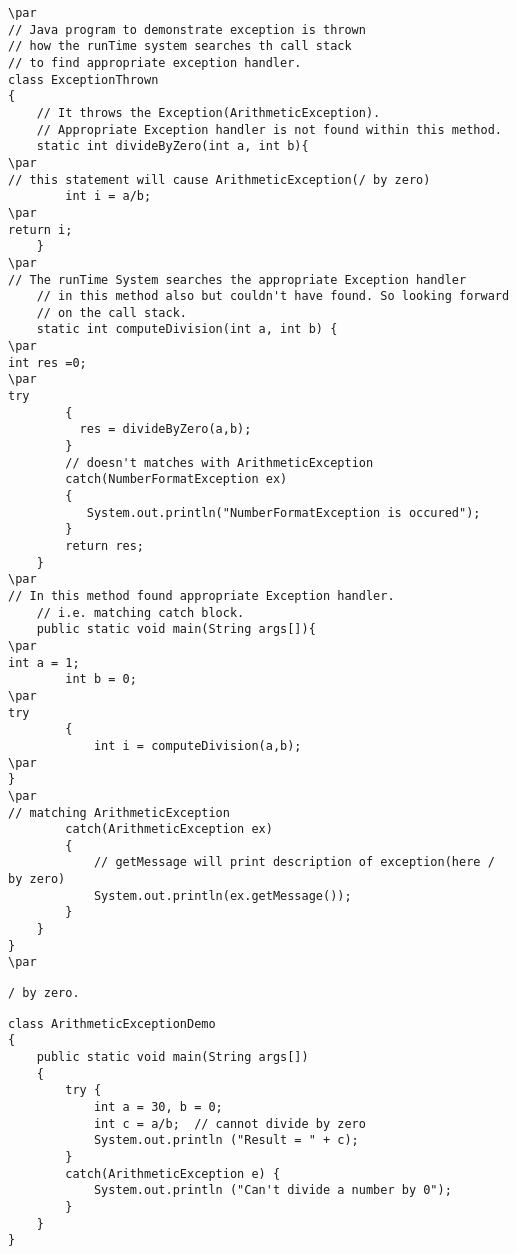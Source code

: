 \documentclass{book}
\def\lthtmlcheckvsize{\ifdim\ht\sizebox<\vsize 
  \ifdim\wd\sizebox<\hsize\expandafter\hfill\fi \expandafter\vfill
  \else\expandafter\vss\fi}%
\begin{document}
{\newpage\clearpage
{}%
\begin{lstlisting}
\par
// Java program to demonstrate exception is thrown 
// how the runTime system searches th call stack 
// to find appropriate exception handler. 
class ExceptionThrown 
{ 
    // It throws the Exception(ArithmeticException). 
    // Appropriate Exception handler is not found within this method. 
    static int divideByZero(int a, int b){ 
\par
// this statement will cause ArithmeticException(/ by zero) 
        int i = a/b;  
\par
return i; 
    } 
\par
// The runTime System searches the appropriate Exception handler 
    // in this method also but couldn't have found. So looking forward 
    // on the call stack. 
    static int computeDivision(int a, int b) { 
\par
int res =0; 
\par
try
        { 
          res = divideByZero(a,b); 
        } 
        // doesn't matches with ArithmeticException 
        catch(NumberFormatException ex) 
        { 
           System.out.println("NumberFormatException is occured");  
        } 
        return res; 
    } 
\par
// In this method found appropriate Exception handler. 
    // i.e. matching catch block. 
    public static void main(String args[]){ 
\par
int a = 1; 
        int b = 0; 
\par
try
        { 
            int i = computeDivision(a,b); 
\par
} 
\par
// matching ArithmeticException 
        catch(ArithmeticException ex) 
        { 
            // getMessage will print description of exception(here / by zero) 
            System.out.println(ex.getMessage()); 
        } 
    } 
} 
\par
\end{lstlisting}%
\lthtmlfigureZ
\lthtmlcheckvsize\clearpage}

{\newpage\clearpage
{}%
\begin{lstlisting}
/ by zero.
\end{lstlisting}%
\lthtmlfigureZ
\lthtmlcheckvsize\clearpage}

{\newpage\clearpage
{}%
\begin{lstlisting}
class ArithmeticExceptionDemo 
{ 
    public static void main(String args[]) 
    { 
        try { 
            int a = 30, b = 0; 
            int c = a/b;  // cannot divide by zero 
            System.out.println ("Result = " + c); 
        } 
        catch(ArithmeticException e) { 
            System.out.println ("Can't divide a number by 0"); 
        } 
    } 
} 
\end{lstlisting}%
\lthtmlfigureZ
\lthtmlcheckvsize\clearpage}
\end{document}
